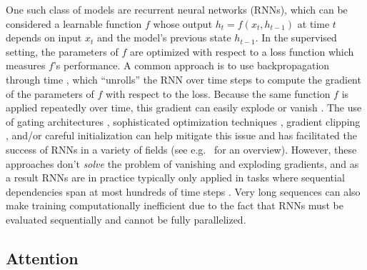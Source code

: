 \documentclass{article} %
\begin{document}
One such class of models are recurrent neural networks (RNNs), which can be considered a learnable function $f$ whose output $h_t = f(x_t, h_{t - 1})$ at time $t$ depends on input $x_t$ and the model's previous state $h_{t - 1}$.
In the supervised setting, the parameters of $f$ are optimized with respect to a loss function which measures $f$'s performance.
A common approach is to use backpropagation through time \cite{werbos1990backpropagation}, which ``unrolls'' the RNN over time steps to compute the gradient of the parameters of $f$ with respect to the loss.
Because the same function $f$ is applied repeatedly over time, this gradient can easily explode or vanish \cite{pascanu2012difficulty,hochreiter1997long,bengio1994learning}.
The use of gating architectures \cite{hochreiter1997long,cho2014learning}, sophisticated optimization techniques \cite{martens2011learning,sutskever2013importance}, gradient clipping \cite{pascanu2012difficulty,graves2013generating}, and/or careful initialization \cite{sutskever2013importance,jaegar2012long,mikolov2014learning,le2015simple} can help mitigate this issue and has facilitated the success of RNNs in a variety of fields (see e.g.\ \cite{graves2012supervised} for an overview).
However, these approaches don't \textit{solve} the problem of vanishing and exploding gradients, and as a result RNNs are in practice typically only applied in tasks where sequential dependencies span at most hundreds of time steps \cite{martens2011learning,sutskever2013importance,le2015simple,hochreiter1997long,krueger2015regularizing,arjovsky2015unitary}.
Very long sequences can also make training computationally inefficient due to the fact that RNNs must be evaluated sequentially and cannot be fully parallelized.

\subsection{Attention}
\end{document}

